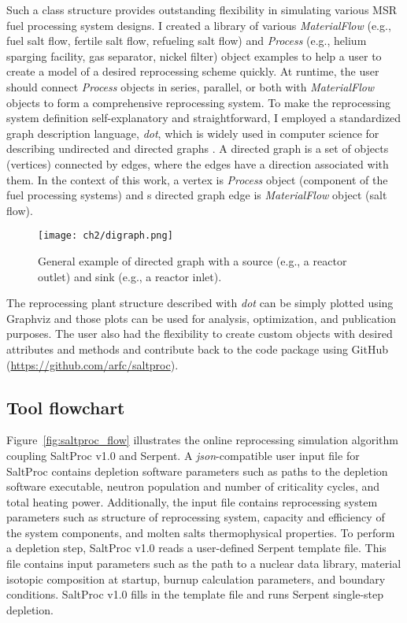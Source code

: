 Such a class structure provides outstanding flexibility in simulating 
various \gls{MSR} fuel processing system designs. I created a library of 
various \textit{MaterialFlow} (e.g., fuel salt flow, fertile salt flow, 
refueling salt flow) and \textit{Process} (e.g., helium sparging facility, gas 
separator, nickel filter) object examples to help a user to create a model of 
a desired reprocessing scheme quickly. At runtime, the user
should connect \textit{Process} objects in series, parallel, or both with 
\textit{MaterialFlow} objects to form a comprehensive reprocessing system. To 
make the reprocessing system definition self-explanatory and straightforward, 
I employed a standardized graph description language, \emph{dot}, which is 
widely used in computer science for describing undirected and directed graphs 
\cite{koutsofios_drawing_1996}. A directed graph is a set of objects 
(vertices) connected by edges, where the edges have a direction associated 
with them. In the context of this work, a vertex is \textit{Process} object 
(component of the fuel processing systems) and s directed graph edge is 
\textit{MaterialFlow} object (salt flow).
\begin{figure}[hbt!] %
	\centering
	\texttt{[image: ch2/digraph.png]}
	\vspace{-0.1in}
	\caption{General example of directed graph with a source (e.g., a reactor 
		outlet) and sink (e.g., a reactor inlet).}
	\label{fig:digraph}
\end{figure}

The reprocessing plant structure described with \emph{dot} can be simply 
plotted using Graphviz \cite{ellson_graphviz_2003} and those plots can be used 
for analysis, optimization, and publication purposes. The user also had the 
flexibility to create custom objects with desired attributes and methods and 
contribute back to the code package using GitHub 
(\url{https://github.com/arfc/saltproc}).	


\subsection{Tool flowchart}
Figure~\ref{fig:saltproc_flow} illustrates the online reprocessing simulation 
algorithm coupling SaltProc v1.0 and Serpent. A \emph{json}-compatible 
user input file for SaltProc contains depletion software parameters such as 
paths to the depletion software executable, neutron population and number of 
criticality cycles, and total heating power. Additionally, the input file 
contains reprocessing system parameters such as structure of reprocessing 
system, capacity and efficiency of the system components, and molten salts 
thermophysical properties. To perform a depletion step, SaltProc v1.0 reads a 
user-defined Serpent template file. This file contains input parameters such 
as the path to a nuclear data library, material isotopic composition at 
startup, burnup calculation parameters, and boundary conditions. SaltProc v1.0 
fills in the template file and runs Serpent single-step depletion. 

